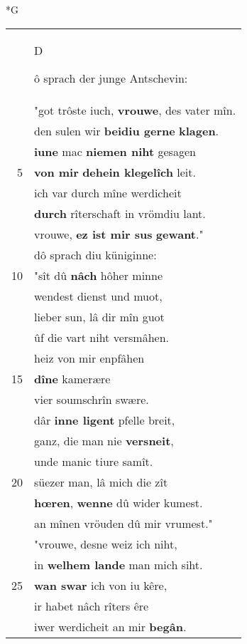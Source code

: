 \documentclass[8pt,a4paper,notitlepage]{article}
\begin{document}
\newpage
\begin{table}[ht]
\begin{minipage}[t]{0.5\linewidth}
\small
\begin{center}*G
\end{center}
\begin{tabular}{rl}
 & \begin{large}D\end{large}ô sprach der junge Antschevin:\\ 
 & "got trôste iuch, \textbf{vrouwe}, des vater mîn.\\ 
 & den sulen wir \textbf{beidiu gerne} \textbf{klagen}.\\ 
 & \textbf{iu}\textbf{ne} mac \textbf{niemen niht} gesagen\\ 
5 & \textbf{von mir} \textbf{dehein klegelîch} leit.\\ 
 & ich var durch mîne werdicheit\\ 
 & \textbf{durch} rîterschaft in vrömdiu lant.\\ 
 & vrouwe, \textbf{ez ist mir sus} \textbf{gewant}."\\ 
 & dô sprach diu küniginne:\\ 
10 & "sît dû \textbf{nâch} hôher minne\\ 
 & wendest dienst und muot,\\ 
 & lieber sun, lâ dir mîn guot\\ 
 & ûf die vart niht versmâhen.\\ 
 & heiz von mir enpfâhen\\ 
15 & \textbf{dîne} kamerære\\ 
 & vier soumschrîn swære.\\ 
 & dâr \textbf{inne ligent} pfelle breit,\\ 
 & ganz, die man nie \textbf{versneit},\\ 
 & unde manic tiure samît.\\ 
20 & süezer man, lâ mich die zît\\ 
 & \textbf{hœren}, \textbf{wenne} dû wider kumest.\\ 
 & an mînen vröuden dû mir vrumest."\\ 
 & "vrouwe, desne weiz ich niht,\\ 
 & in \textbf{welhem lande} man mich siht.\\ 
25 & \textbf{wan swar} ich von iu kêre,\\ 
 & ir habet nâch rîters êre\\ 
 & iwer werdicheit an mir \textbf{begân}.\\ 

\end{tabular}
\end{minipage}
\end{table}
\end{document}
